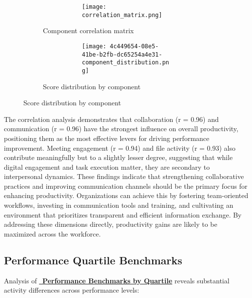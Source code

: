 \documentclass[12pt,a4paper]{article}
\begin{document}
\begin{figure}[H]
\centering
\begin{subfigure}{0.48\textwidth}
\begin{figure}
        \centering
        \begin{figure}
            \centering
            \texttt{[image: correlation\_matrix.png]}
        \end{figure}
    \end{figure}
        \caption{Component correlation matrix}
    \label{fig:correlation_matrix}
\end{subfigure}
\hfill
\begin{subfigure}{0.48\textwidth}
\begin{figure}
        \centering
    \begin{figure}
        \centering
        \texttt{[image: 4c449654-08e5-41be-b2fb-dc65254a4e31-component\_distribution.png]}
    \end{figure}
    \end{figure}
        \caption{Score distribution by component}
    \label{fig:component_distribution}
\end{subfigure}
\end{figure}

The correlation analysis demonstrates that collaboration (r = 0.96) and communication (r = 0.96) have the strongest influence on overall productivity, positioning them as the most effective levers for driving performance improvement. Meeting engagement (r = 0.94) and file activity (r = 0.93) also contribute meaningfully but to a slightly lesser degree, suggesting that while digital engagement and task execution matter, they are secondary to interpersonal dynamics. These findings indicate that strengthening collaborative practices and improving communication channels should be the primary focus for enhancing productivity. Organizations can achieve this by fostering team-oriented workflows, investing in communication tools and training, and cultivating an environment that prioritizes transparent and efficient information exchange. By addressing these dimensions directly, productivity gains are likely to be maximized across the workforce.


\subsection{Performance Quartile Benchmarks}

Analysis of \textcolor{primaryGold}{\href{https://fixysaskihumorizijuv.supabase.co/storage/v1/object/public/research-files/41847d2c-9002-4901-95ed-34ea72ed53c1-performance_benchmarks_by_quartile.csv?download=}{{\normalsize\faChartArea}\, \textbf{Performance Benchmarks by Quartile}}} reveals substantial activity differences across performance levels:
\end{document}
